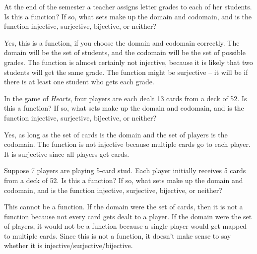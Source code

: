 \begin{questions}
\begin{answer}
	\end{answer}



\question At the end of the semester a teacher assigns letter grades to each of her students.  Is this a function?  If so, what sets make up the domain and codomain, and is the function injective, surjective, bijective, or neither?

	\begin{answer}
	   Yes, this is a function, if you choose the domain and codomain correctly.  The domain will be the set of students, and the codomain will be the set of possible grades.  The function is almost certainly not injective, because it is likely that two students will get the same grade.  The function might be surjective -- it will be if there is at least one student who gets each grade.
	\end{answer}



\question In the game of {\em Hearts}, four players are each dealt 13 cards from a deck of 52.  Is this a function?  If so, what sets make up the domain and codomain, and is the function injective, surjective, bijective, or neither?

	\begin{answer}
		Yes, as long as the set of cards is the domain and the set of players is the codomain.  The function is not injective because multiple cards go to each player.  It is surjective since all players get cards.
	\end{answer}


\question Suppose 7 players are playing 5-card stud.  Each player initially receives 5 cards from a deck of 52.  Is this a function?  If so, what sets make up the domain and codomain, and is the function injective, surjective, bijective, or neither?

	\begin{answer}
	  This cannot be a function.  If the domain were the set of cards, then it is not a function because not every card gets dealt to a player.  If the domain were the set of players, it would not be a function because a single player would get mapped to multiple cards.  Since this is not a function, it doesn't make sense to say whether it is injective/surjective/bijective.
	\end{answer}

\end{questions}
